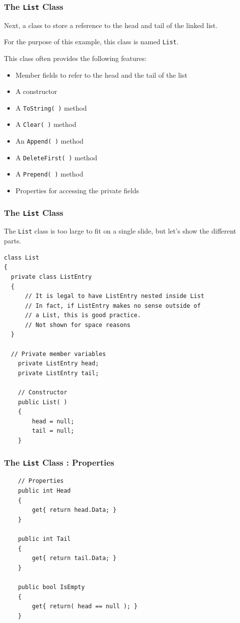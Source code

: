 \begin{frame}
\frametitle{The \texttt{List} Class}

Next, a class to store a reference to the head and tail of the linked list.

For the purpose of this example, this class is named \texttt{List}.

This class often provides the following features:
\begin{itemize}
    \item Member fields to refer to the head and the tail of the list
    \item A constructor
    \item A \texttt{ToString( )} method
    \item A \texttt{Clear( )} method
    \item An \texttt{Append( )} method
    \item A \texttt{DeleteFirst( )} method
    \item A \texttt{Prepend( )} method
    \item Properties for accessing the private fields
\end{itemize}

\end{frame}

\begin{frame}[fragile]
\frametitle{The \texttt{List} Class}
The \texttt{List} class is too large to fit on a single slide, but let's show the different parts.

{\scriptsize
\begin{verbatim}
class List
{
  private class ListEntry
  {
      // It is legal to have ListEntry nested inside List
      // In fact, if ListEntry makes no sense outside of
      // a List, this is good practice.
      // Not shown for space reasons
  }
  
  // Private member variables
    private ListEntry head;
    private ListEntry tail;

    // Constructor
    public List( )
    {
        head = null;
        tail = null;
    }

\end{verbatim}
}
\end{frame}

\begin{frame}[fragile]
\frametitle{The \texttt{List} Class : Properties}

{\scriptsize
\begin{verbatim}
    // Properties
    public int Head
    {
        get{ return head.Data; }
    }

    public int Tail
    {
        get{ return tail.Data; }
    }

    public bool IsEmpty
    {
        get{ return( head == null ); } 
    }
\end{verbatim}
}
\end{frame}

